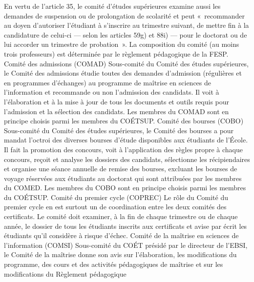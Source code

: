\documentclass [12 pt]{article}
\begin{document}
            En vertu de l'article 35, le comité d'études supérieures examine aussi les demandes
                de suspension ou de prolongation de scolarité et peut « recommander au doyen
                d'autoriser l'étudiant à s'inscrire au trimestre suivant, de mettre fin à la
                candidature de celui-ci — selon les articles 59g) et 88i) — pour le doctorat ou de
                lui accorder un trimestre de probation ».
            La composition du comité (au moins trois professeurs) est déterminée par le règlement
                pédagogique de la FESP.
            Comité des admissions (COMAD)
            Sous-comité du Comité des études supérieures, le Comité des admissions étudie toutes
                des demandes d'admission (régulières et en programmes d'échanges) au programme de
                maîtrise en sciences de l'information et recommande ou non l'admission des
                candidats. Il voit à l'élaboration et à la mise à jour de tous les documents et
                outils requis pour l'admission et la sélection des candidats. Les membres du COMAD
                sont en principe choisis parmi les membres du COÉTSUP.
            Comité des bourses (COBO)
            Sous-comité du Comité des études supérieures, le Comité des bourses a pour mandat
                l'octroi des diverses bourses d'étude disponibles aux étudiants de l'École. Il fait
                la promotion des concours, voit à l'application des règles propre à chaque concours,
                reçoit et analyse les dossiers des candidats, sélectionne les récipiendaires et
                organise une séance annuelle de remise des bourses, excluant les bourses de voyage
                réservées aux étudiants au doctorat qui sont attribuées par les membres du COMED.
                Les membres du COBO sont en principe choisis parmi les membres du COÉTSUP.
            Comité du premier cycle (COPREC)
            Le rôle du Comité du premier cycle en est surtout un de coordination entre les deux
                comités des certificats. Le comité doit examiner, à la fin de chaque trimestre ou de
                chaque année, le dossier de tous les étudiants inscrits aux certificats et avise par
                écrit les étudiants qu'il considère à risque d'échec.
            Comité de la maîtrise en sciences de l'information (COMSI)
            Sous-comité du COÉT présidé par le directeur de l'EBSI, le Comité de la maîtrise
                donne son avis sur l'élaboration, les modifications du programme, des cours et des
                activités pédagogiques de maîtrise et sur les modifications du Règlement pédagogique
\end{document}
